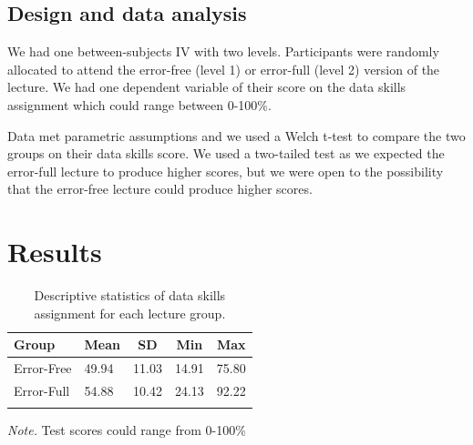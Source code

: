 \documentclass[
  man,floatsintext]{apa6}
\begin{document}
\hypertarget{design-and-data-analysis}{%
\subsection{Design and data analysis}\label{design-and-data-analysis}}

We had one between-subjects IV with two levels. Participants were randomly allocated to attend the error-free (level 1) or error-full (level 2) version of the lecture. We had one dependent variable of their score on the data skills assignment which could range between 0-100\%.

Data met parametric assumptions and we used a Welch t-test to compare the two groups on their data skills score. We used a two-tailed test as we expected the error-full lecture to produce higher scores, but we were open to the possibility that the error-free lecture could produce higher scores.

\hypertarget{results}{%
\section{Results}\label{results}}

\begin{table}[tbp]

\begin{center}
\begin{threeparttable}

\caption{\label{tab:descriptives-table}Descriptive statistics of data skills assignment for each lecture group.}

\begin{tabular}{lllll}
\toprule
Group & \multicolumn{1}{c}{Mean} & \multicolumn{1}{c}{SD} & \multicolumn{1}{c}{Min} & \multicolumn{1}{c}{Max}\\
\midrule
Error-Free & 49.94 & 11.03 & 14.91 & 75.80\\
Error-Full & 54.88 & 10.42 & 24.13 & 92.22\\
\bottomrule
\addlinespace
\end{tabular}

\begin{tablenotes}[para]
\normalsize{\textit{Note.} Test scores could range from 0-100\%}
\end{tablenotes}

\end{threeparttable}
\end{center}

\end{table}
\end{document}
